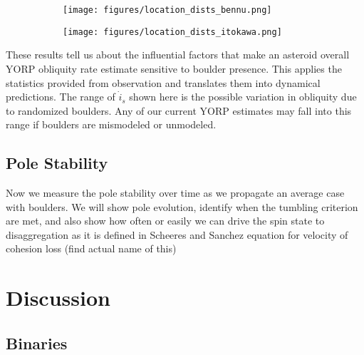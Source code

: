 \documentclass[12pt,notitlepage]{article}
\begin{document}
\begin{figure}[H]
    \begin{subfigure}{0.49\textwidth}
        \centering
        \texttt{[image: figures/location\_dists\_bennu.png]}
        \caption{}
    \end{subfigure}
    \hfill
    \begin{subfigure}{0.49\textwidth}
        \centering
        \texttt{[image: figures/location\_dists\_itokawa.png]}
        \caption{}
    \end{subfigure}  
    \caption{}
    \label{fig:location_percents}
\end{figure}

These results tell us about the influential factors that make an asteroid overall YORP obliquity rate estimate sensitive to boulder presence. This applies the statistics provided from observation and translates them into dynamical predictions. The range of $\dot{\mathit{i}}_s$ shown here is the possible variation in obliquity due to randomized boulders. Any of our current YORP estimates may fall into this range if boulders are mismodeled or unmodeled.



\subsection{Pole Stability}

Now we measure the pole stability over time as we propagate an average case with boulders. We will show pole evolution, identify when the tumbling criterion are met, and also show how often or easily we can drive the spin state to disaggregation as it is defined in Scheeres and Sanchez equation for velocity of cohesion loss (find actual name of this)


\section{Discussion} \label{discussion}
\subsection{Binaries}
\end{document}
